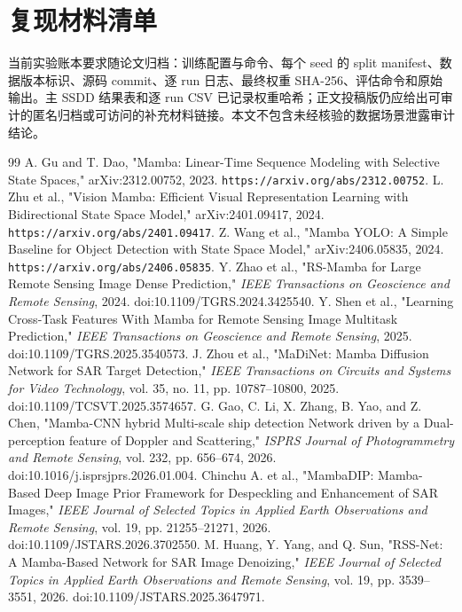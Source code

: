 \documentclass[UTF8,12pt,a4paper]{ctexart}
\begin{document}
\section{复现材料清单}
当前实验账本要求随论文归档：训练配置与命令、每个 seed 的 split manifest、数据版本标识、源码 commit、逐 run 日志、最终权重 SHA-256、评估命令和原始输出。主 SSDD 结果表和逐 run CSV 已记录权重哈希；正文投稿版仍应给出可审计的匿名归档或可访问的补充材料链接。本文不包含未经核验的数据场景泄露审计结论。
{\footnotesize
\setlength{\itemsep}{0pt}
\begin{thebibliography}{99}
A. Gu and T. Dao, "Mamba: Linear-Time Sequence Modeling with Selective State Spaces," arXiv:2312.00752, 2023. \texttt{https://arxiv.org/abs/2312.00752}.
L. Zhu et al., "Vision Mamba: Efficient Visual Representation Learning with Bidirectional State Space Model," arXiv:2401.09417, 2024. \texttt{https://arxiv.org/abs/2401.09417}.
Z. Wang et al., "Mamba YOLO: A Simple Baseline for Object Detection with State Space Model," arXiv:2406.05835, 2024. \texttt{https://arxiv.org/abs/2406.05835}.
Y. Zhao et al., "RS-Mamba for Large Remote Sensing Image Dense Prediction," \emph{IEEE Transactions on Geoscience and Remote Sensing}, 2024. doi:10.1109/TGRS.2024.3425540.
Y. Shen et al., "Learning Cross-Task Features With Mamba for Remote Sensing Image Multitask Prediction," \emph{IEEE Transactions on Geoscience and Remote Sensing}, 2025. doi:10.1109/TGRS.2025.3540573.
J. Zhou et al., "MaDiNet: Mamba Diffusion Network for SAR Target Detection," \emph{IEEE Transactions on Circuits and Systems for Video Technology}, vol. 35, no. 11, pp. 10787--10800, 2025. doi:10.1109/TCSVT.2025.3574657.
G. Gao, C. Li, X. Zhang, B. Yao, and Z. Chen, "Mamba-CNN hybrid Multi-scale ship detection Network driven by a Dual-perception feature of Doppler and Scattering," \emph{ISPRS Journal of Photogrammetry and Remote Sensing}, vol. 232, pp. 656--674, 2026. doi:10.1016/j.isprsjprs.2026.01.004.
Chinchu A. et al., "MambaDIP: Mamba-Based Deep Image Prior Framework for Despeckling and Enhancement of SAR Images," \emph{IEEE Journal of Selected Topics in Applied Earth Observations and Remote Sensing}, vol. 19, pp. 21255--21271, 2026. doi:10.1109/JSTARS.2026.3702550.
M. Huang, Y. Yang, and Q. Sun, "RSS-Net: A Mamba-Based Network for SAR Image Denoizing," \emph{IEEE Journal of Selected Topics in Applied Earth Observations and Remote Sensing}, vol. 19, pp. 3539--3551, 2026. doi:10.1109/JSTARS.2025.3647971.

\end{thebibliography}}
\end{document}
